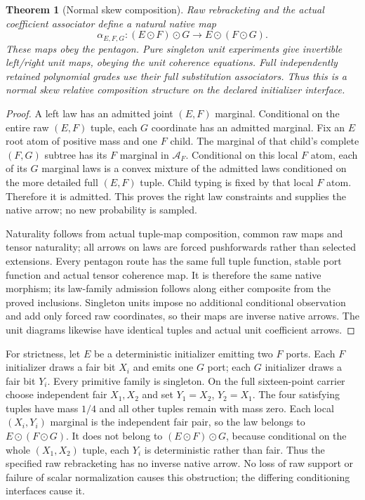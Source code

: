 \documentclass[11pt]{article}
\newtheorem{theorem}{Theorem}\newtheorem{proposition}[theorem]{Proposition}
\begin{document}
\begin{theorem}[Normal skew composition]
Raw rebracketing and the actual coefficient associator define a natural native map
\[
 \alpha_{E,F,G}:(E\odot F)\odot G\longrightarrow E\odot(F\odot G).
\]
These maps obey the pentagon. Pure singleton unit experiments give invertible left/right unit maps, obeying the unit coherence equations. Full independently retained polynomial grades use their full substitution associators. Thus this is a normal skew relative composition structure on the declared initializer interface.
\end{theorem}
\begin{proof}
A left law has an admitted joint $(E,F)$ marginal. Conditional on the entire raw $(E,F)$ tuple, each $G$ coordinate has an admitted marginal. Fix an $E$ root atom of positive mass and one $F$ child. The marginal of that child's complete $(F,G)$ subtree has its $F$ marginal in $\mathcal A_F$. Conditional on this local $F$ atom, each of its $G$ marginal laws is a convex mixture of the admitted laws conditioned on the more detailed full $(E,F)$ tuple. Child typing is fixed by that local $F$ atom. Therefore it is admitted. This proves the right law constraints and supplies the native arrow; no new probability is sampled.

Naturality follows from actual tuple-map composition, common raw maps and tensor naturality; all arrows on laws are forced pushforwards rather than selected extensions. Every pentagon route has the same full tuple function, stable port function and actual tensor coherence map. It is therefore the same native morphism; its law-family admission follows along either composite from the proved inclusions. Singleton units impose no additional conditional observation and add only forced raw coordinates, so their maps are inverse native arrows. The unit diagrams likewise have identical tuples and actual unit coefficient arrows.\end{proof}

For strictness, let $E$ be a deterministic initializer emitting two $F$ ports. Each $F$ initializer draws a fair bit $X_i$ and emits one $G$ port; each $G$ initializer draws a fair bit $Y_i$. Every primitive family is singleton. On the full sixteen-point carrier choose independent fair $X_1,X_2$ and set $Y_1=X_2$, $Y_2=X_1$. The four satisfying tuples have mass $1/4$ and all other tuples remain with mass zero. Each local $(X_i,Y_i)$ marginal is the independent fair pair, so the law belongs to $E\odot(F\odot G)$. It does not belong to $(E\odot F)\odot G$, because conditional on the whole $(X_1,X_2)$ tuple, each $Y_i$ is deterministic rather than fair. Thus the specified raw rebracketing has no inverse native arrow. No loss of raw support or failure of scalar normalization causes this obstruction; the differing conditioning interfaces cause it.
\end{document}
